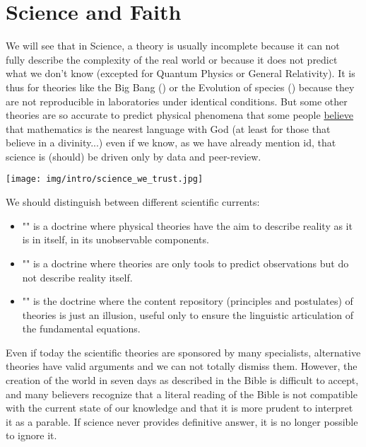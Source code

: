 	\newpage
	\thispagestyle{empty}
	\mbox{}
	\section{Science and Faith}
	We will see that in Science, a theory is usually incomplete because it can not fully describe the complexity of the real world or because it does not predict what we don't know (excepted for Quantum Physics or General Relativity). It is thus for theories like the Big Bang () or the Evolution of species () because they are not reproducible in laboratories under identical conditions.  But some other theories are so accurate to predict physical phenomena that some people \underline{believe} that mathematics is the nearest language with God (at least for those that believe in a divinity...) even if we know, as we have already mention id, that science is (should) be driven only by data and peer-review.
	\begin{center}
		\texttt{[image: img/intro/science\_we\_trust.jpg]}
	\end{center}	

	We should distinguish between different scientific currents: 
	\begin{itemize}
		\item "" is a doctrine where physical theories have the aim to describe reality as it is in itself, in its unobservable components. 
	
		\item "" is a doctrine where theories are only tools to predict observations but do not describe reality itself. 
	
		\item "" is the doctrine where the content repository (principles and postulates) of theories is just an illusion, useful only to ensure the linguistic articulation of the fundamental equations. 
	\end{itemize}

	\pagebreak
	Even if today the scientific theories are sponsored by many specialists, alternative theories have valid arguments and we can not totally dismiss them. However, the creation of the world in seven days as described in the Bible is difficult to accept, and many believers recognize that a literal reading of the Bible is not compatible with the current state of our knowledge and that it is more prudent to interpret it as a parable. If science never provides definitive answer, it is no longer possible to ignore it. 

